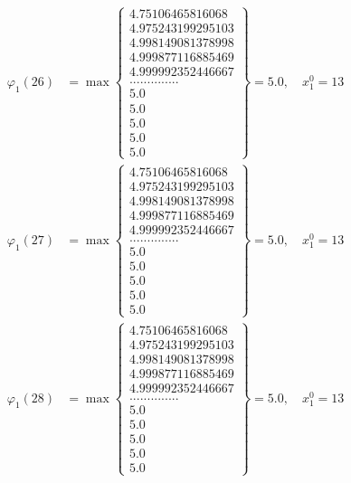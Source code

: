 \documentclass{article}
\begin{document}
\begin{align*}
  
  
  
\varphi_{1}(26) &= \max \left\{ \begin{array}{c}
4.75106465816068 \\
 4.975243199295103 \\
 4.998149081378998 \\
 4.999877116885469 \\
 4.999992352446667 \\
 .............. \\
 5.0 \\
 5.0 \\
 5.0 \\
 5.0 \\
 5.0
\end{array} \right\} = 5.0, \quad x_{1}^0 = 13\\
  
  
  
  
\varphi_{1}(27) &= \max \left\{ \begin{array}{c}
4.75106465816068 \\
 4.975243199295103 \\
 4.998149081378998 \\
 4.999877116885469 \\
 4.999992352446667 \\
 .............. \\
 5.0 \\
 5.0 \\
 5.0 \\
 5.0 \\
 5.0
\end{array} \right\} = 5.0, \quad x_{1}^0 = 13\\
  
  
  
  
\varphi_{1}(28) &= \max \left\{ \begin{array}{c}
4.75106465816068 \\
 4.975243199295103 \\
 4.998149081378998 \\
 4.999877116885469 \\
 4.999992352446667 \\
 .............. \\
 5.0 \\
 5.0 \\
 5.0 \\
 5.0 \\
 5.0
\end{array} \right\} = 5.0, \quad x_{1}^0 = 13\\
  

\end{align*}
\end{document}
